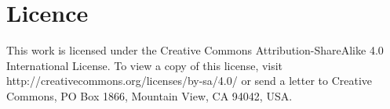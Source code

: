 \documentclass[a4paper]{book}
\begin{document}
\section*{Licence}
This work is licensed under the Creative Commons Attribution-ShareAlike 4.0 International License.
To view a copy of this license, visit http://creativecommons.org/licenses/by-sa/4.0/ or send a letter to Creative Commons, PO Box 1866, Mountain View, CA 94042, USA.

\tableofcontents













\end{document}
